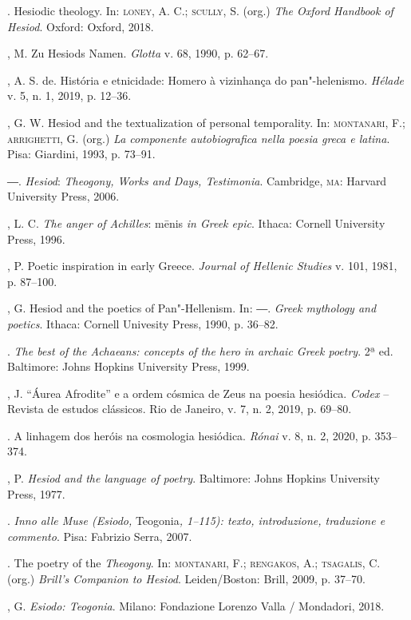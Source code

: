 \begin{bibliohedra}
\titidem. Hesiodic theology. In: \textsc{loney}, A. C.; \textsc{scully}, S. (org.) \emph{The
Oxford Handbook of Hesiod}. Oxford: Oxford, 2018.

, M. Zu Hesiods Namen. \emph{Glotta} v. 68, 1990, p. 62--67.

, A. S. de. História e etnicidade: Homero à vizinhança do
pan"-helenismo. \emph{Hélade} v. 5, n. 1, 2019, p. 12--36.

, G. W. Hesiod and the textualization of personal temporality. In:
\textsc{montanari}, F.; \textsc{arrighetti}, G. (org.) \emph{La componente autobiografica
nella poesia greca e latina}. Pisa: Giardini, 1993, p. 73--91.

―. \emph{Hesiod}: \emph{Theogony, Works and Days, Testimonia}.
Cambridge, \textsc{ma}: Harvard University Press, 2006.

, L. C. \emph{The anger of Achilles}: mēnis \emph{in Greek
epic}. Ithaca: Cornell University Press, 1996.

, P. Poetic inspiration in early Greece. \emph{Journal of Hellenic
Studies} v. 101, 1981, p. 87--100.

, G. Hesiod and the poetics of Pan"-Hellenism. In: ―. \emph{Greek
mythology and poetics}. Ithaca: Cornell Univesity Press, 1990, p. 36--82.

\titidem. \emph{The best of the Achaeans: concepts of the hero in archaic Greek
poetry}. 2ª ed. Baltimore: Johns Hopkins University Press, 1999.

, J. ``Áurea Afrodite'' e a ordem cósmica de Zeus na poesia
hesiódica. \emph{Codex} -- Revista de estudos clássicos. Rio de Janeiro,
v. 7, n. 2, 2019, p. 69--80.

\titidem. A linhagem dos heróis na cosmologia hesiódica. \emph{Rónai} v. 8, n.
2, 2020, p. 353--374.

, P. \emph{Hesiod and the language of poetry}. Baltimore: Johns
Hopkins University Press, 1977.

\titidem. \emph{Inno alle Muse (Esiodo,} Teogonia\emph{, 1--115): texto,
introduzione, traduzione e commento}. Pisa: Fabrizio Serra, 2007.

\titidem. The poetry of the \emph{Theogony}. In: \textsc{montanari}, F.; \textsc{rengakos}, A.;
\textsc{tsagalis}, C. (org.) \emph{Brill's Companion to Hesiod}. Leiden/Boston:
Brill, 2009, p. 37--70.

, G. \emph{Esiodo: Teogonia}. Milano: Fondazione Lorenzo
Valla / Mondadori, 2018.


\end{bibliohedra}
